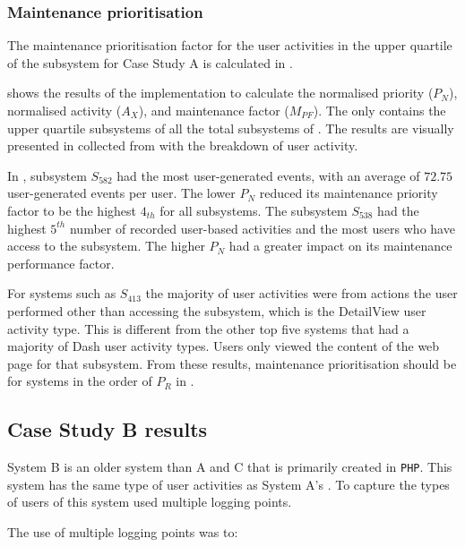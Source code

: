 \subsubsection{Maintenance prioritisation}
The maintenance prioritisation factor for the user activities in the upper quartile of the subsystem for Case Study A is calculated in .



 shows the results of the implementation  to calculate the normalised priority ($P_N$), normalised activity ($A_X$), and maintenance factor ($M_{PF}$). The  only contains the upper quartile subsystems of all the total subsystems of . The results are visually presented in  collected from  with the breakdown of user activity. \par In , subsystem $S_{582}$ had the most user-generated events, with an average of $72.75$ user-generated events per user. The lower $P_N$ reduced its maintenance priority factor to be the highest $4_{th}$ for all subsystems. The subsystem $S_{538}$ had the highest $5^{th}$ number of recorded user-based activities and the most users who have access to the subsystem. The higher $P_N$ had a greater impact on its maintenance performance factor.\par For systems such as $S_{413}$ the majority of user activities were from actions the user performed other than accessing the subsystem, which is the DetailView user activity type. This is different from the other top five systems that had a majority of Dash user activity types. Users only viewed the content of the web page for that subsystem. From these results, maintenance prioritisation should be for systems in the order of $P_R$ in . 

\subsection{Case Study B results}\label{sec:ch3_csB}
System B is an older system than A and C that is primarily created in \texttt{PHP}. This system has the same type of user activities as System A's . To capture the types of users of  this system used multiple logging points.\par The use of multiple logging points was to:

